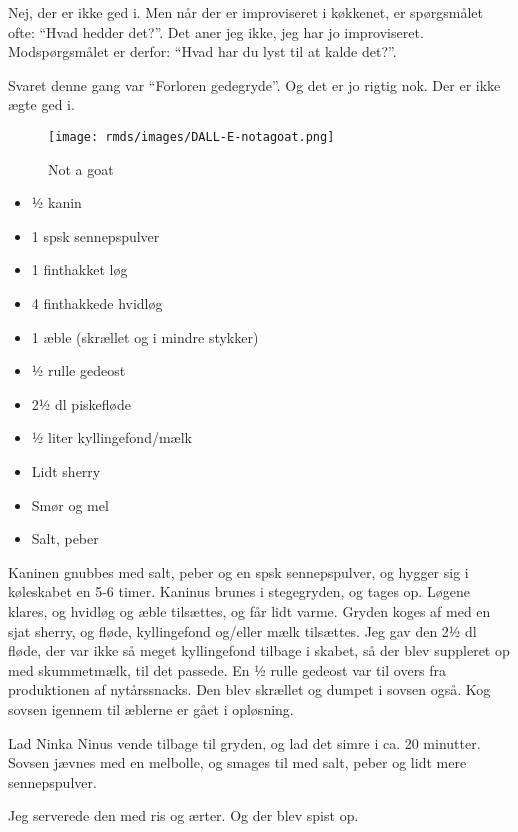 \documentclass[
  letterpaper,
  DIV=11,
  numbers=noendperiod]{scrreprt}
\providecommand{\tightlist}{%
  \setlength{\itemsep}{0pt}\setlength{\parskip}{0pt}}\usepackage{longtable,booktabs,array}
\begin{document}
Nej, der er ikke ged i. Men når der er improviseret i køkkenet, er
spørgsmålet ofte: ``Hvad hedder det?''. Det aner jeg ikke, jeg har jo
improviseret. Modspørgsmålet er derfor: ``Hvad har du lyst til at kalde
det?''.

Svaret denne gang var ``Forloren gedegryde''. Og det er jo rigtig nok.
Der er ikke ægte ged i.

\begin{figure}

{\centering \texttt{[image: rmds/images/DALL-E-notagoat.png]}

}

\caption{Not a goat}

\end{figure}

\begin{itemize}
\tightlist
\item
  ½ kanin
\item
  1 spsk sennepspulver
\item
  1 finthakket løg
\item
  4 finthakkede hvidløg
\item
  1 æble (skrællet og i mindre stykker)
\item
  ½ rulle gedeost
\item
  2½ dl piskefløde
\item
  ½ liter kyllingefond/mælk
\item
  Lidt sherry
\item
  Smør og mel
\item
  Salt, peber
\end{itemize}

Kaninen gnubbes med salt, peber og en spsk sennepspulver, og hygger sig
i køleskabet en 5-6 timer. Kaninus brunes i stegegryden, og tages op.
Løgene klares, og hvidløg og æble tilsættes, og får lidt varme. Gryden
koges af med en sjat sherry, og fløde, kyllingefond og/eller mælk
tilsættes. Jeg gav den 2½ dl fløde, der var ikke så meget kyllingefond
tilbage i skabet, så der blev suppleret op med skummetmælk, til det
passede. En ½ rulle gedeost var til overs fra produktionen af
nytårssnacks. Den blev skrællet og dumpet i sovsen også. Kog sovsen
igennem til æblerne er gået i opløsning.

Lad Ninka Ninus vende tilbage til gryden, og lad det simre i ca. 20
minutter. Sovsen jævnes med en melbolle, og smages til med salt, peber
og lidt mere sennepspulver.

Jeg serverede den med ris og ærter. Og der blev spist op.
\end{document}
